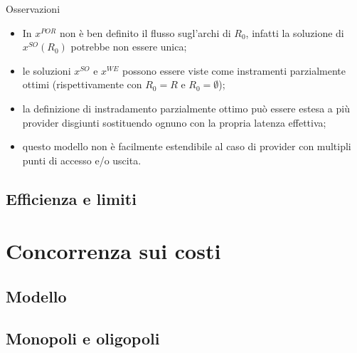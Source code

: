 \documentclass{beamer}
\theoremstyle{plain}
\theoremstyle{definition}
\theoremstyle{remark}
\begin{document}
\begin{frame}{Osservazioni}
  \begin{itemize}
  \item In $x^{POR}$ non è ben definito il flusso sugl'archi di $R_0$,
    infatti la soluzione di $x^{SO}(R_0)$ potrebbe non essere unica;
  \item le soluzioni $x^{SO}$ e $x^{WE}$ possono essere viste come
    instramenti parzialmente ottimi (rispettivamente con $R_0=R$ e
    $R_0=\emptyset$);
  \item la definizione di instradamento parzialmente ottimo può essere
    estesa a più provider disgiunti sostituendo ognuno con la propria
    latenza effettiva;
  \item questo modello non è facilmente estendibile al caso di
    provider con multipli punti di accesso e/o uscita.
  \end{itemize}
\end{frame}

\subsection{Efficienza e limiti}


\section{Concorrenza sui costi}

\subsection{Modello}

\subsection{Monopoli e oligopoli}
\end{document}
